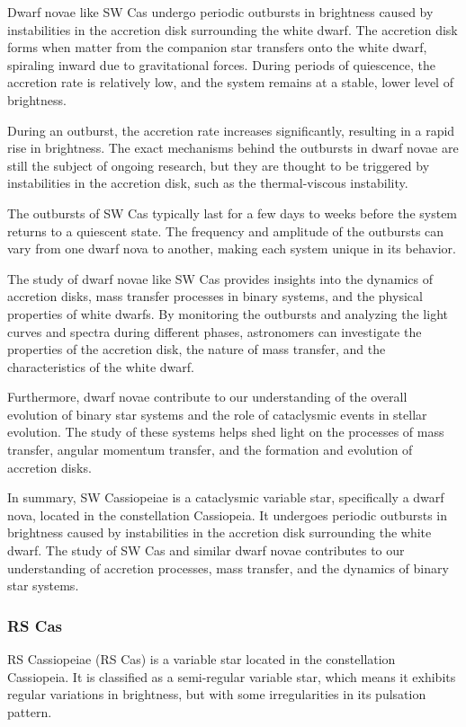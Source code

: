 Dwarf novae like SW Cas undergo periodic outbursts in brightness caused by instabilities in the accretion disk surrounding the white dwarf. The accretion disk forms when matter from the companion star transfers onto the white dwarf, spiraling inward due to gravitational forces. During periods of quiescence, the accretion rate is relatively low, and the system remains at a stable, lower level of brightness.

During an outburst, the accretion rate increases significantly, resulting in a rapid rise in brightness. The exact mechanisms behind the outbursts in dwarf novae are still the subject of ongoing research, but they are thought to be triggered by instabilities in the accretion disk, such as the thermal-viscous instability.

The outbursts of SW Cas typically last for a few days to weeks before the system returns to a quiescent state. The frequency and amplitude of the outbursts can vary from one dwarf nova to another, making each system unique in its behavior.

The study of dwarf novae like SW Cas provides insights into the dynamics of accretion disks, mass transfer processes in binary systems, and the physical properties of white dwarfs. By monitoring the outbursts and analyzing the light curves and spectra during different phases, astronomers can investigate the properties of the accretion disk, the nature of mass transfer, and the characteristics of the white dwarf.

Furthermore, dwarf novae contribute to our understanding of the overall evolution of binary star systems and the role of cataclysmic events in stellar evolution. The study of these systems helps shed light on the processes of mass transfer, angular momentum transfer, and the formation and evolution of accretion disks.

In summary, SW Cassiopeiae is a cataclysmic variable star, specifically a dwarf nova, located in the constellation Cassiopeia. It undergoes periodic outbursts in brightness caused by instabilities in the accretion disk surrounding the white dwarf. The study of SW Cas and similar dwarf novae contributes to our understanding of accretion processes, mass transfer, and the dynamics of binary star systems.


\subsubsection*{ RS Cas }
RS Cassiopeiae (RS Cas) is a variable star located in the constellation Cassiopeia. It is classified as a semi-regular variable star, which means it exhibits regular variations in brightness, but with some irregularities in its pulsation pattern.

